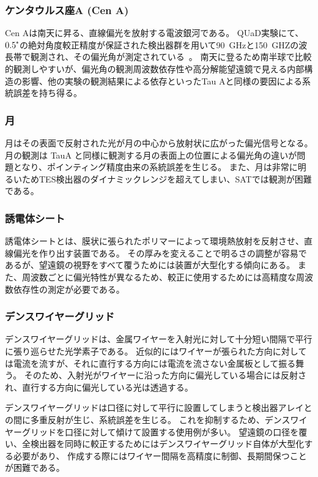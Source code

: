 \documentclass[../../main.tex]{subfiles}
\begin{document}
\subsubsection{ケンタウルス座A (Cen A)}
Cen Aは南天に昇る、直線偏光を放射する電波銀河である。
QUaD実験にて、$0.5\tcdegree$の絶対角度較正精度が保証された検出器群を用いて\SI{90}{GHz}と\SI{150}{GHZ}の波長帯で観測され、その偏光角が測定されている~\cite{so:Zemcov_2010}。
南天に登るため南半球で比較的観測しやすいが、偏光角の観測周波数依存性や高分解能望遠鏡で見える内部構造の影響、他の実験の観測結果による依存といったTau Aと同様の要因による系統誤差を持ち得る。
\subsubsection{月}
月はその表面で反射された光が月の中心から放射状に広がった偏光信号となる。
月の観測は TauA と同様に観測する月の表面上の位置による偏光角の違いが問題となり、ポインティング精度由来の系統誤差を生じる。
また、月は非常に明るいためTES検出器のダイナミックレンジを超えてしまい、SATでは観測が困難である。
\subsubsection{誘電体シート}
誘電体シートとは、膜状に張られたポリマーによって環境熱放射を反射させ、直線偏光を作り出す装置である。
その厚みを変えることで明るさの調整が容易であるが、望遠鏡の視野をすべて覆うためには装置が大型化する傾向にある。
また、周波数ごとに偏光特性が異なるため、較正に使用するためには高精度な周波数依存性の測定が必要である。

\subsubsection{デンスワイヤーグリッド}
デンスワイヤーグリッドは、金属ワイヤーを入射光に対して十分短い間隔で平行に張り巡らせた光学素子である。
近似的にはワイヤーが張られた方向に対しては電流を流すが、それに直行する方向には電流を流さない金属板として振る舞う。
そのため、入射光がワイヤーに沿った方向に偏光している場合には反射され、直行する方向に偏光している光は透過する。

デンスワイヤーグリッドは口径に対して平行に設置してしまうと検出器アレイとの間に多重反射が生じ、系統誤差を生じる。
これを抑制するため、デンスワイヤーグリッドを口径に対して傾けて設置する使用例が多い。
望遠鏡の口径を覆い、全検出器を同時に較正するためにはデンスワイヤーグリッド自体が大型化する必要があり、
作成する際にはワイヤー間隔を高精度に制御、長期間保つことが困難である。
\end{document}

